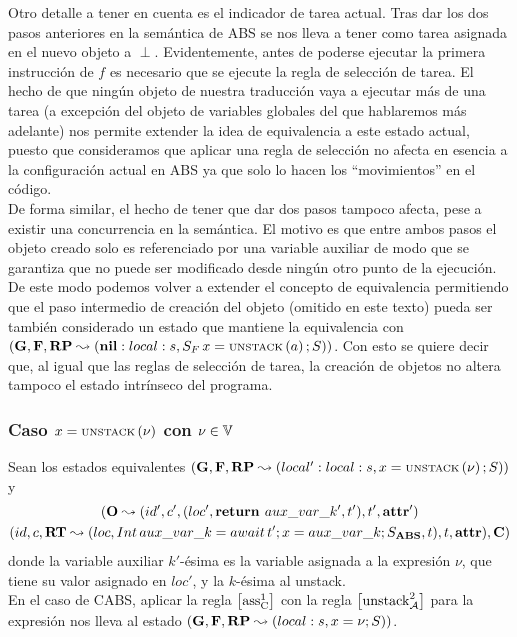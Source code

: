 Otro detalle a tener en cuenta es el indicador de tarea actual. Tras dar los dos pasos anteriores en la semántica de ABS se nos lleva a tener como tarea asignada en el nuevo objeto a $\perp$. Evidentemente, antes de poderse ejecutar la primera instrucción de $f$ es necesario que se ejecute la regla de selección de tarea. El hecho de que ningún objeto de nuestra traducción vaya a ejecutar más de una tarea (a excepción del objeto de variables globales del que hablaremos más adelante) nos permite extender la idea de equivalencia a este estado actual, puesto que consideramos que aplicar una regla de selección no afecta en esencia a la configuración actual en ABS ya que solo lo hacen los ``movimientos'' en el código.\\

De forma similar, el hecho de tener que dar dos pasos tampoco afecta, pese a existir una concurrencia en la semántica. El motivo es que entre ambos pasos el objeto creado solo es referenciado por una variable auxiliar de modo que se garantiza que no puede ser modificado desde ningún otro punto de la ejecución. De este modo podemos volver a extender el concepto de equivalencia permitiendo que el paso intermedio de creación del objeto (omitido en este texto) pueda ser también considerado un estado que mantiene la equivalencia con $(\mathbf{G}, \mathbf{F}, \textbf{RP} \leadsto (\textbf{nil}:local:s, S_F\,x = \text{\scriptsize{UNSTACK}}\left(a\right)\mbox{;\,}S))$. Con esto se quiere decir que, al igual que las reglas de selección de tarea, la creación de objetos no altera tampoco el estado intrínseco del programa.

\subsubsection{Caso $x = \text{\scriptsize{UNSTACK}}\left(\nu\right)$ con $\nu \in \mathbb{V}$}
Sean los estados equivalentes $(\mathbf{G}, \mathbf{F}, \textbf{RP} \leadsto (local':local:s,x = \text{\scriptsize{UNSTACK}}\left(\nu\right)\mbox{;\,}S))$ y
\begin{multline*}
  (\mathbf{O} \leadsto (id', c', (loc', \textbf{return } aux\_var\_k', t'), t', \textbf{attr}')\\
  (id, c, \textbf{RT} \leadsto (loc, Int\, aux\_var\_k = await\,t'\mbox{;\,} x = aux\_var\_k\mbox{;\,} S_{\textbf{ABS}}, t), t, \textbf{attr}), \mathbf{C})
\end{multline*}
donde la variable auxiliar $k'$-ésima es la variable asignada a la expresión $\nu$, que tiene su valor asignado en $loc'$, y la $k$-ésima al unstack.\\

En el caso de CABS, aplicar la regla $\left[ \text{ass}_{\text{C}}^{1} \right]$ con la regla $\left[ \text{unstack}_{\mathcal{A}}^{2} \right]$ para la expresión nos lleva al estado $(\mathbf{G}, \mathbf{F}, \textbf{RP} \leadsto (local:s, x = \nu \mbox{;\,} S))$.\\

